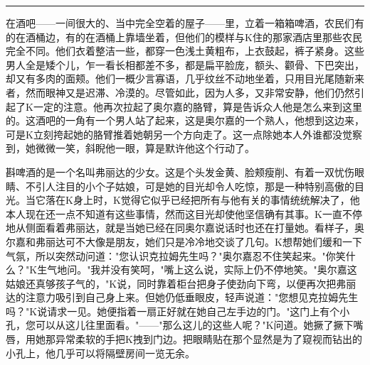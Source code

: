 \documentclass[12pt,a4paper]{article}
\begin{document}
\noindent\rule{\textwidth}{0.4pt}

\vspace{0.3em}



在酒吧——一间很大的、当中完全空着的屋子——里，立着一箱箱啤酒，农民们有的在酒桶边，有的在酒桶上靠墙坐着，但他们的模样与K住的那家酒店里那些农民完全不同。他们衣着整洁一些，都穿一色浅土黄粗布，上衣鼓起，裤子紧身。这些男人全是矮个儿，乍一看长相都差不多，都是扁平脸庞，额头、颧骨、下巴突出，却又有多肉的面颊。他们一概少言寡语，几乎纹丝不动地坐着，只用目光尾随新来者，然而眼神又是迟滞、冷漠的。尽管如此，因为人多，又非常安静，他们仍然引起了K一定的注意。他再次拉起了奥尔嘉的胳臂，算是告诉众人他是怎么来到这里的。这酒吧的一角有一个男人站了起来，这是奥尔嘉的一个熟人，他想到这边来，可是K立刻挎起她的胳臂推着她朝另一个方向走了。这一点除她本人外谁都没觉察到，她微微一笑，斜睨他一眼，算是默许他这个行动了。

斟啤酒的是一个名叫弗丽达的少女。这是个头发金黄、脸颊瘦削、有着一双忧伤眼睛、不引人注目的小个子姑娘，可是她的目光却令人吃惊，那是一种特别高傲的目光。当它落在K身上时，K觉得它似乎已经把所有与他有关的事情统统解决了，他本人现在还一点不知道有这些事情，然而这目光却使他坚信确有其事。K一直不停地从侧面看着弗丽达，就是当她已经在同奥尔嘉说话时也还在打量她。看样子，奥尔嘉和弗丽达可不大像是朋友，她们只是冷冷地交谈了几句。K想帮她们缓和一下气氛，所以突然动问道："您认识克拉姆先生吗？"奥尔嘉忍不住笑起来。"你笑什么？"K生气地问。"我并没有笑呵，"嘴上这么说，实际上仍不停地笑。"奥尔嘉这姑娘还真够孩子气的，"K说，同时靠着柜台把身子使劲向下弯，以便再次把弗丽达的注意力吸引到自己身上来。但她仍低垂眼皮，轻声说道："您想见克拉姆先生吗？"K说请求一见。她便指着一扇正好就在她自己左手边的门。"这门上有个小孔，您可以从这儿往里面看。"——"那么这儿的这些人呢？"K问道。她撅了撅下嘴唇，用她那异常柔软的手把K拽到门边。把眼睛贴在那个显然是为了窥视而钻出的小孔上，他几乎可以将隔壁房间一览无余。
\end{document}
